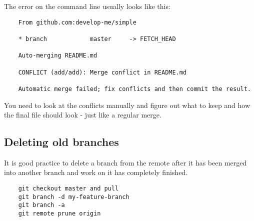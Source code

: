 The error on the command line usually looks like this:

\begin{verbatim}
    From github.com:develop-me/simple

    * branch            master     -> FETCH_HEAD
     
	Auto-merging README.md

    CONFLICT (add/add): Merge conflict in README.md

    Automatic merge failed; fix conflicts and then commit the result.
\end{verbatim}

You need to look at the conflicts manually and figure out what to keep and how the final file should look - just like a regular merge.
\\


\subsection{Deleting old branches}

It is good practice to delete a branch from the remote after it has been merged into another branch and work on it has completely finished.

\begin{verbatim}
    git checkout master and pull
    git branch -d my-feature-branch
    git branch -a
    git remote prune origin
\end{verbatim}

